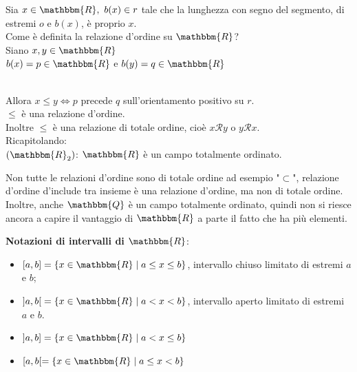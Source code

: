 \documentclass[12pt]{report}
\begin{document}
	Sia $x \in \mathbbm{R},\ b(x) \in r $ tale che la lunghezza con segno del segmento, di estremi $o$ e $b(x)$, è proprio $x$. \\
	Come è definita la relazione d'ordine su $\mathbbm{R}$? \\
	Siano $x,y \in \mathbbm{R}$ \\
	$b(x) = p \in \mathbbm{R}$ e $b(y) = q \in \mathbbm{R}$ \\
	 \\
	Allora $x \leq y \iff p$ precede $q$ sull'orientamento positivo su $r$. \\
	$\leq$ è una relazione d'ordine.  \\
	Inoltre $\leq$ è una relazione di totale ordine, cioè $x\mathscr{R}y$ o $y\mathscr{R}x$. \\
	Ricapitolando: \\
	$(\mathbbm{R}_2)$: $\mathbbm{R}$ è un campo totalmente ordinato. \\
	\begin{note}{}{}
		Non tutte le relazioni d'ordine sono di totale ordine ad esempio "$\subset$", relazione d'ordine d'include tra insieme è una relazione d'ordine, ma non di totale ordine. \\
		Inoltre, anche $\mathbbm{Q}$ è un campo totalmente ordinato, quindi non si riesce ancora a capire il vantaggio di $\mathbbm{R}$ a parte il fatto che ha più elementi.
	\end{note}
	\textbf{Notazioni di intervalli di $\mathbbm{R}$}:
	\begin{itemize}
		\item $[a,b] = \{x \in \mathbbm{R} \mid a \leq x \leq b\}$, intervallo chiuso limitato di estremi $a$ e $b$;
		\item $\left]a,b\right[ = \{x \in \mathbbm{R} \mid a < x < b\}$, intervallo aperto limitato di estremi $a$ e $b$.
		\item $\left]a,b\right] = \{ x \in \mathbbm{R} \mid a < x \leq b\}$
		\item $[a, b [ = \{x \in \mathbbm{R} \mid a \leq x < b\}$
	\end{itemize}
\end{document}
